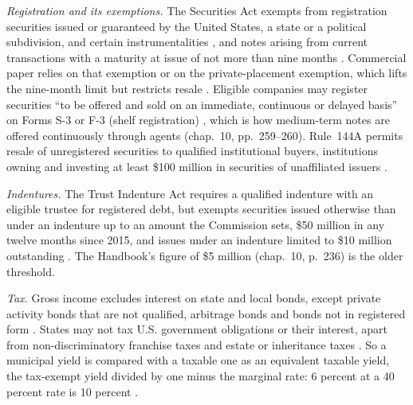 \begin{qfrule}\label{rule:bond-issuance-legal-tax}
 \emph{Registration and its exemptions.} The Securities Act exempts from registration securities issued or guaranteed by the United States, a state or a political subdivision, and certain instrumentalities \citep[sec.~3(a)(2)]{usc-15-77c}, and notes arising from current transactions with a maturity at issue of not more than nine months \citep[sec.~3(a)(3)]{usc-15-77c}. Commercial paper relies on that exemption or on the private-placement exemption, which lifts the nine-month limit but restricts resale \citep[chap.~13, p.~302]{s7-fabozzifixed}. Eligible companies may register securities ``to be offered and sold on an immediate, continuous or delayed basis'' on Forms S-3 or F-3 (shelf registration) \citep[para.~(a)(1)(x)]{cfr-17-230-415}, which is how medium-term notes are offered continuously through agents (chap.~10, pp.~259--260). Rule~144A permits resale of unregistered securities to qualified institutional buyers, institutions owning and investing at least \$100 million in securities of unaffiliated issuers \citep[para.~(a)(1)]{cfr-17-230-144a}.

\emph{Indentures.} The Trust Indenture Act requires a qualified indenture with an eligible trustee for registered debt, but exempts securities issued otherwise than under an indenture up to an amount the Commission sets, \$50 million in any twelve months since 2015, and issues under an indenture limited to \$10 million outstanding \citep[sec.~304(a)(8)--(9)]{usc-15-77ddd} \citep[sec.~260.4a-1]{cfr-17-260-4a-1}. The Handbook's figure of \$5 million (chap.~10, p.~236) is the older threshold.

\emph{Tax.} Gross income excludes interest on state and local bonds, except private activity bonds that are not qualified, arbitrage bonds and bonds not in registered form \citep[secs.~(a)--(b)]{usc-26-103}. States may not tax U.S. government obligations or their interest, apart from non-discriminatory franchise taxes and estate or inheritance taxes \citep[sec.~(a)]{usc-31-3124}. So a municipal yield is compared with a taxable one as an equivalent taxable yield, the tax-exempt yield divided by one minus the marginal rate: 6 percent at a 40 percent rate is 10 percent \citep[chap.~9, p.~221]{s7-fabozzifixed}.


\end{qfrule}
